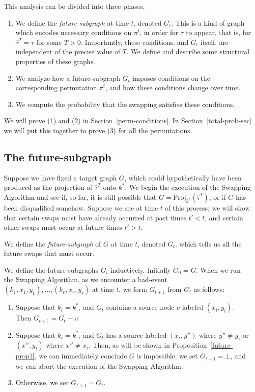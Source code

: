 This analysis can be divided into three phases.
\begin{enumerate}
\item We define the \emph{future-subgraph} at time $t$, denoted $G_t$. This is a kind of graph which encodes necessary conditions on $\pi^t$, in order for $\tau$ to appear, that is, for $\hat \tau^T = \tau$ for some $T > 0$. Importantly, these conditions, and $G_t$ itself, are independent of the precise value of $T$. We define and describe some structural properties of these graphs.
\item We analyze how a future-subgraph $G_t$ imposes conditions on the corresponding permutation $\pi^t$, and how these conditions change over time.
\item We compute the probability that the swapping satisfies these conditions.
\end{enumerate}

We will prove (1) and (2) in Section~\ref{perm-conditions}. In Section~\ref{total-prob-sec} we will put this together to prove (3) for all the permutations.
\subsection{The future-subgraph}
Suppose we have fixed a target graph $G$, which could hypothetically have been produced as the projection of $\hat \tau^T$ onto $k^*$. We begin the execution of the Swapping Algorithm and see if, so far, it is still possible that $G = \text{Proj}_{k^*}(\hat \tau^T)$, or if $G$ has been disqualified somehow. Suppose we are at time $t$ of this process; we will show that certain swaps must have already occurred at past times $t' < t$, and certain other swaps must occur at future times $t' > t$.  

We define the \emph{future-subgraph} of $G$ at time $t$, denoted $G_t$, which tells us all the future swaps that must occur.  

\begin{definition}
\label{future-defn}
We define the future-subgraphs $G_t$ inductively. Initially $G_0 = G$.  When we run the Swapping Algorithm, as we encounter a bad-event $(k_1, x_1, y_1), \dots, (k_r, x_r, y_r)$ at time $t$, we form $G_{t+1}$ from $G_t$ as follows:
\begin{enumerate}
\item Suppose that $k_i = k^*$, and $G_t$ contains a source node $v$ labeled $(x_i,y_i)$. Then $G_{t+1} = G_t - v$.
\item Suppose that $k_i = k^*$, and $G_t$ has a source labeled $(x_i, y'')$ where $y'' \neq y_i$ or $(x'', y_i)$ where $x'' \neq x_i$. Then, as will be shown in Proposition~\ref{future-prop1}, we can immediately conclude $G$ is impossible; we set $G_{t+1} = \bot$, and we can abort the execution of the Swapping Algorithm.
\item Otherwise, we set $G_{t+1} = G_t$.
\end{enumerate}
\end{definition}


